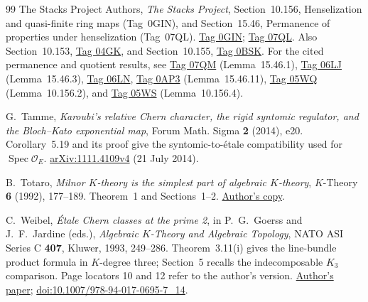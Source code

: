 \documentclass[11pt,a4paper]{amsart}
\numberwithin{equation}{section}
\theoremstyle{definition}
\theoremstyle{remark}
\newcommand{\OO}{\mathcal O}
\newcommand{\Spec}{\operatorname{Spec}}
\begin{document}
\begin{thebibliography}{99}
The Stacks Project Authors, \emph{The Stacks Project}, Section~10.156, Henselization and quasi-finite ring maps (Tag~0GIN), and Section~15.46, Permanence of properties under henselization (Tag~07QL).
\href{https://stacks.math.columbia.edu/tag/0GIN}{Tag 0GIN}; \href{https://stacks.math.columbia.edu/tag/07QL}{Tag 07QL}. Also Section~10.153, \href{https://stacks.math.columbia.edu/tag/04GK}{Tag 04GK}, and Section~10.155, \href{https://stacks.math.columbia.edu/tag/0BSK}{Tag 0BSK}.
For the cited permanence and quotient results, see
\href{https://stacks.math.columbia.edu/tag/07QM}{Tag 07QM}
(Lemma~15.46.1),
\href{https://stacks.math.columbia.edu/tag/06LJ}{Tag 06LJ}
(Lemma~15.46.3),
\href{https://stacks.math.columbia.edu/tag/06LN}{Tag 06LN},
\href{https://stacks.math.columbia.edu/tag/0AP3}{Tag 0AP3}
(Lemma~15.46.11),
\href{https://stacks.math.columbia.edu/tag/05WQ}{Tag 05WQ}
(Lemma~10.156.2), and
\href{https://stacks.math.columbia.edu/tag/05WS}{Tag 05WS}
(Lemma~10.156.4).

G.~Tamme, \emph{Karoubi's relative Chern character, the rigid syntomic regulator, and the Bloch--Kato exponential map},
Forum Math. Sigma \textbf{2} (2014), e20.
Corollary~5.19 and its proof give the syntomic-to-\'etale compatibility used for $\Spec\OO_E$.
\href{https://arxiv.org/abs/1111.4109v4}{arXiv:1111.4109v4}
(21 July 2014).

B.~Totaro, \emph{Milnor $K$-theory is the simplest part of algebraic
$K$-theory}, $K$-Theory \textbf{6} (1992), 177--189.
Theorem~1 and Sections~1--2.
\href{https://www.math.ucla.edu/~totaro/papers/public_html/milnor.pdf}
{Author's copy}.

C.~Weibel, \emph{\'Etale Chern classes at the prime 2},
in P.~G.~Goerss and J.~F.~Jardine (eds.),
\emph{Algebraic $K$-Theory and Algebraic Topology},
NATO ASI Series C \textbf{407}, Kluwer, 1993, 249--286.
Theorem~3.11(i) gives the line-bundle product formula in $K$-degree three;
Section~5 recalls the indecomposable $K_3$ comparison.
Page locators 10 and 12 refer to the author's version.
\href{https://sites.math.rutgers.edu/~weibel/archive/papers-dir/chernclass.pdf}{Author's paper};
\href{https://doi.org/10.1007/978-94-017-0695-7_14}{doi:10.1007/978-94-017-0695-7\_14}.


\end{thebibliography}
\end{document}
